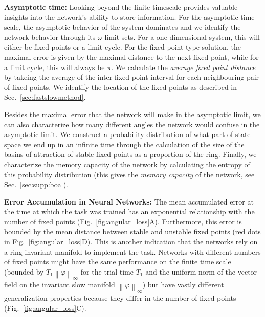 \documentclass{article} %
\newcommand{\ptitle}[1]{\textbf{#1:}\xspace}
\newcounter{ct}
\newcommand{\uniformNorm}[1]{\left\|#1\right\|_\infty} %
\theoremstyle{definition}
\theoremstyle{remark}
\begin{document}
\ptitle{Asymptotic time}
Looking beyond the finite timescale provides valuable insights into the network's ability to store information.
For the asymptotic time scale, the asymptotic behavior of the system dominates and we identify the network behavior through its \(\omega\)-limit sets.
For a one-dimensional system, this will either be fixed points or a limit cycle.
For the fixed-point type solution, the maximal error is given by the maximal distance to the next fixed point, while for a limit cycle, this will always be \(\pi\).
We calculate the \emph{average fixed point distance} by takeing the average of the inter-fixed-point interval for each neighbouring pair of fixed points.
We identify the location of the fixed points as described in Sec.~\ref{sec:fastslowmethod}.

Besides the maximal error that the network will make in the asymptotic limit, we can also characterize how many different angles the network would confuse in the asymptotic limit.
We construct a probability distribution of what part of state space we end up in an infinite time through the calculation of the size of the basins of attraction of stable fixed points as a proportion of the ring.
Finally, we characterize the memory capacity of the network by calculating the entropy of this probability distribution (this gives the \emph{memory capacity} of the network, see Sec.~\ref{sec:supp:boa}).


\ptitle{Error Accumulation in Neural Networks}
The mean accumulated error at the time at which the task was trained has an exponential relationship with the number of fixed points (Fig.~\ref{fig:angular_loss}A).
Furthermore, this error is bounded by the mean distance between stable and unstable fixed points (red dots in Fig.~\ref{fig:angular_loss}D).
This is another indication that the networks rely on a ring invariant manifold to implement the task.
Networks with different numbers of fixed points might have the same performance on the finite time scale (bounded by \(T_1\uniformNorm{\varphi}\) for the trial time \(T_1\) and the uniform norm of the vector field on the invariant slow manifold \(\uniformNorm{\varphi}\)) but have vastly different generalization properties because they differ in the number of fixed points (Fig.~\ref{fig:angular_loss}C).
\end{document}
